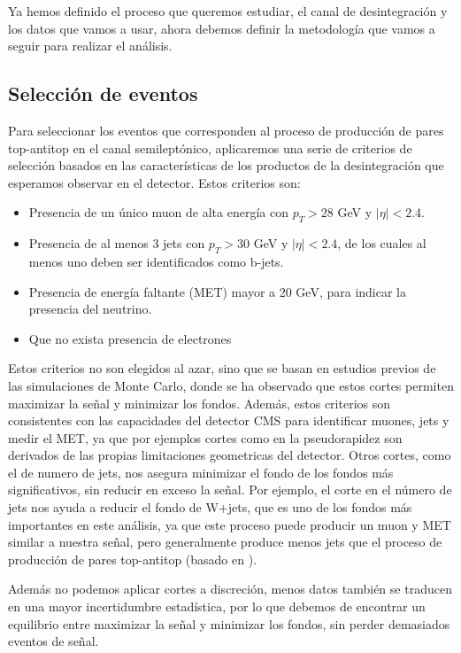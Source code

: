 \documentclass[9pt,a4paper,twocolumn,twoside]{rho-class/rho}
\begin{document}
Ya hemos definido el proceso que queremos estudiar, el canal de desintegración y los datos que vamos a usar, ahora debemos definir la metodología que vamos a seguir para realizar el análisis.
\subsection{Selección de eventos}

Para seleccionar los eventos que corresponden al proceso de producción de pares top-antitop en el canal semileptónico, aplicaremos una serie de criterios de selección basados en las características de los productos de la desintegración que esperamos observar en el detector. Estos criterios son:
\begin{itemize}
    \item Presencia de un único muon de alta energía con $p_T > 28$ GeV y $|\eta| < 2.4$.
    \item Presencia de al menos 3 jets con $p_T > 30$ GeV y $|\eta| < 2.4$, de los cuales al menos uno deben ser identificados como b-jets.
    \item Presencia de energía faltante (MET) mayor a 20 GeV, para indicar la presencia del neutrino.
    \item Que no exista presencia de electrones
\end{itemize}

Estos criterios no son elegidos al azar, sino que se basan en estudios previos de las simulaciones de Monte Carlo, donde se ha observado que estos cortes permiten maximizar la señal y minimizar los fondos. Además, estos criterios son consistentes con las capacidades del detector CMS para identificar muones, jets y medir el MET, ya que por ejemplos cortes como en la pseudorapidez son derivados de las propias limitaciones geometricas del detector. Otros cortes, como el de numero de jets, nos asegura minimizar el fondo de los fondos más significativos, sin reducir en exceso la señal. Por ejemplo, el corte en el número de jets nos ayuda a reducir el fondo de W+jets, que es uno de los fondos más importantes en este análisis, ya que este proceso puede producir un muon y MET similar a nuestra señal, pero generalmente produce menos jets que el proceso de producción de pares top-antitop (basado en \cite{cms2013ttbar_ljets}).

Además no podemos aplicar cortes a discreción, menos datos también se traducen en una mayor incertidumbre estadística, por lo que debemos de encontrar un equilibrio entre maximizar la señal y minimizar los fondos, sin perder demasiados eventos de señal.
\end{document}
